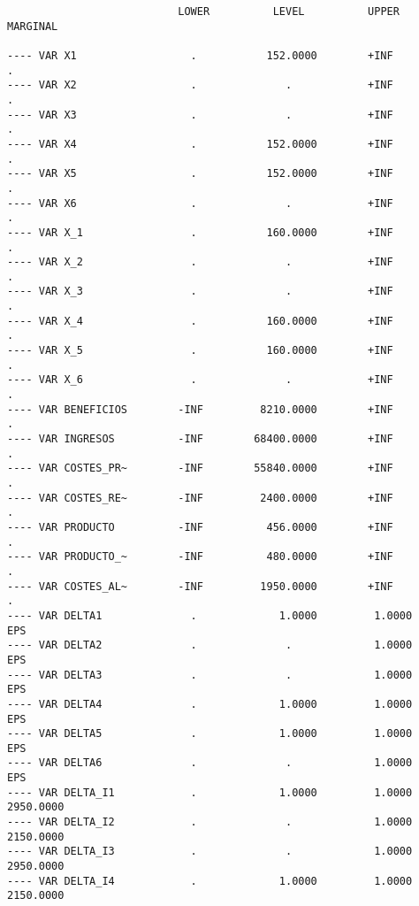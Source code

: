 \documentclass[12pt,a4paper,twoside,openright,titlepage,final]{article}
\begin{document}
\begin{verbatim}
                           LOWER          LEVEL          UPPER         MARGINAL

---- VAR X1                  .           152.0000        +INF             .          
---- VAR X2                  .              .            +INF             .          
---- VAR X3                  .              .            +INF             .          
---- VAR X4                  .           152.0000        +INF             .          
---- VAR X5                  .           152.0000        +INF             .          
---- VAR X6                  .              .            +INF             .          
---- VAR X_1                 .           160.0000        +INF             .          
---- VAR X_2                 .              .            +INF             .          
---- VAR X_3                 .              .            +INF             .          
---- VAR X_4                 .           160.0000        +INF             .          
---- VAR X_5                 .           160.0000        +INF             .          
---- VAR X_6                 .              .            +INF             .          
---- VAR BENEFICIOS        -INF         8210.0000        +INF             .          
---- VAR INGRESOS          -INF        68400.0000        +INF             .          
---- VAR COSTES_PR~        -INF        55840.0000        +INF             .          
---- VAR COSTES_RE~        -INF         2400.0000        +INF             .          
---- VAR PRODUCTO          -INF          456.0000        +INF             .          
---- VAR PRODUCTO_~        -INF          480.0000        +INF             .          
---- VAR COSTES_AL~        -INF         1950.0000        +INF             .          
---- VAR DELTA1              .             1.0000         1.0000         EPS         
---- VAR DELTA2              .              .             1.0000         EPS         
---- VAR DELTA3              .              .             1.0000         EPS         
---- VAR DELTA4              .             1.0000         1.0000         EPS         
---- VAR DELTA5              .             1.0000         1.0000         EPS         
---- VAR DELTA6              .              .             1.0000         EPS         
---- VAR DELTA_I1            .             1.0000         1.0000      2950.0000      
---- VAR DELTA_I2            .              .             1.0000      2150.0000      
---- VAR DELTA_I3            .              .             1.0000      2950.0000      
---- VAR DELTA_I4            .             1.0000         1.0000      2150.0000      

\end{verbatim}
\end{document}
